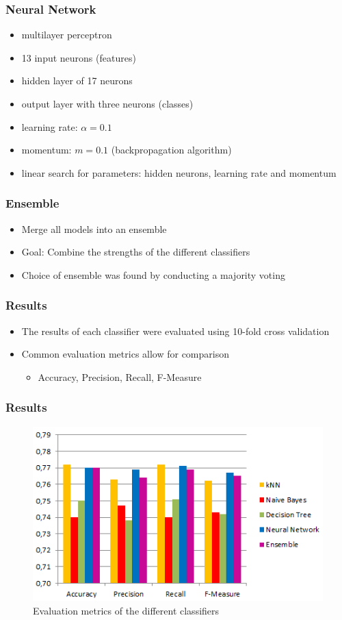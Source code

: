 \begin{frame}[fragile]
	\frametitle{Neural Network}
	\onslide<+->
	\begin{itemize}
		\item<+-> multilayer perceptron
		\item<+-> 13 input neurons (features)
		\item<+-> hidden layer of 17 neurons
		\item<+-> output layer with three neurons (classes)
		\item<+-> learning rate: \(\alpha=0.1\)
		\item<+-> momentum:  \(m=0.1\) (backpropagation algorithm)
		\item<+-> linear search for parameters: hidden neurons, learning rate and momentum
	\end{itemize}
\end{frame}

\begin{frame}
	\frametitle{Ensemble}
	\onslide<+->
	\begin{itemize}
		\item<+-> Merge all models into an ensemble
		\item<+-> Goal: Combine the strengths of the different classifiers
		\item<+-> Choice of ensemble was found by conducting a majority voting
	\end{itemize}
\end{frame}

\begin{frame}
  \frametitle{Results}
  \begin{itemize}
    \item<+-> The results of each classifier were evaluated using
      10-fold cross validation
    \item<+-> Common evaluation metrics allow for comparison
      \begin{itemize}
        \item Accuracy, Precision, Recall, F-Measure
      \end{itemize}
  \end{itemize}
\end{frame}

\begin{frame}
	\frametitle{Results}
	\begin{figure}[h]
		\centering
		\includegraphics[width=0.7\columnwidth]{../../charts/results.png}
		\caption{Evaluation metrics of the different classifiers}
		\label{fig:result}
	\end{figure}
\end{frame}

